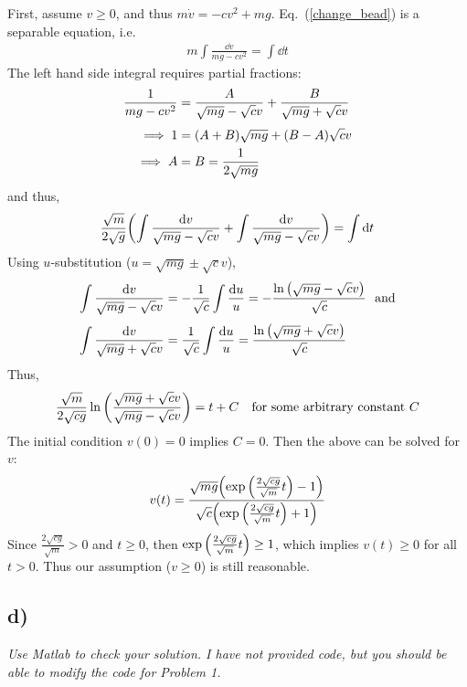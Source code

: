 \documentclass[12pt]{article}
\begin{document}
First, assume $v \geq 0$, and thus $m\dot{v} = -cv^2 + mg$.  Eq.~(\ref{change_bead}) is a separable equation, i.e.
\begin{align*}
	m\int \frac{\dd v}{mg - cv^2} = \int \dd t
\end{align*}
The left hand side integral requires partial fractions:
\begin{align*}
	\frac{1}{mg - cv^2} &= \frac{A}{\sqrt{mg} - \sqrt{c}v} + \frac{B}{\sqrt{mg} + \sqrt{c}v} \\[.1cm]
	\implies 1 &= \qty(A + B)\sqrt{mg} + \qty(B - A)\sqrt{c}v \\
	\implies A &= B = \frac{1}{2\sqrt{mg}}
\end{align*}
and thus,
\begin{align*}
	\frac{\sqrt{m}}{2\sqrt{g}}\qty(\int \frac{\dd v}{\sqrt{mg} - \sqrt{c}v} + \int \frac{\dd v}{\sqrt{mg} - \sqrt{c}v}) = \int \dd t
\end{align*}
Using $u$-substitution ($u = \sqrt{mg} \pm \sqrt{c}v$),
\begin{align*}
	\int \frac{\dd v}{\sqrt{mg} - \sqrt{c}v} &= -\frac{1}{\sqrt{c}}\int\frac{\dd u}{u} = -\frac{\ln\qty(\sqrt{mg} - \sqrt{c}v)}{\sqrt{c}}\ \ \text{and} \\[.1cm]
	\int \frac{\dd v}{\sqrt{mg} + \sqrt{c}v} &= \frac{1}{\sqrt{c}}\int\frac{\dd u}{u} = \frac{\ln\qty(\sqrt{mg} + \sqrt{c}v)}{\sqrt{c}}
\end{align*}
Thus,
\begin{align*}
	\frac{\sqrt{m}}{2\sqrt{cg}}\ln\qty(\frac{\sqrt{mg} + \sqrt{c}v}{\sqrt{mg} - \sqrt{c}v}) = t + C\ \ \ \text{for some arbitrary constant $C$}
\end{align*}
The initial condition $v(0) = 0$ implies $C = 0$.  Then the above can be solved for $v$:
\begin{equation}
	\label{bead_solution}
	v(t) = \frac{\sqrt{mg}\qty(\exp\qty(\frac{2\sqrt{cg}}{\sqrt{m}}t) - 1)}{\sqrt{c}\qty(\exp\qty(\frac{2\sqrt{cg}}{\sqrt{m}}t) + 1)}
\end{equation}
Since $\frac{2\sqrt{cg}}{\sqrt{m}} > 0$ and $t \geq 0$, then $\exp\qty(\frac{2\sqrt{cg}}{\sqrt{m}}t) \geq 1$, which implies $v(t) \geq 0$ for all $t > 0$.  Thus our assumption ($v \geq 0$) is still reasonable.

\subsection*{ d)}
{\it Use Matlab to check your solution.  I have not provided code, but you should be able to modify the code for Problem 1.}
\end{document}
